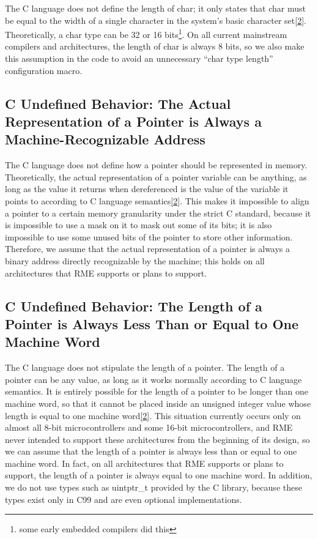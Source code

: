 The C language does not define the length of char; it only states that char must be equal to the width of a single character in the system's basic character set\hyperref[cite:9-2]{{[}2{]}}. Theoretically, a char type can be 32 or 16 bits\footnote{some early embedded compilers did this}. On all current mainstream compilers and architectures, the length of char is always 8 bits, so we also make this assumption in the code to avoid an unnecessary ``char type length'' configuration macro.

\subsection{C Undefined Behavior: The Actual Representation of a Pointer is Always a Machine-Recognizable Address}\label{subsec:9-pointer-representation}

The C language does not define how a pointer should be represented in memory. Theoretically, the actual representation of a pointer variable can be anything, as long as the value it returns when dereferenced is the value of the variable it points to according to C language semantics\hyperref[cite:9-2]{{[}2{]}}. This makes it impossible to align a pointer to a certain memory granularity under the strict C standard, because it is impossible to use a mask on it to mask out some of its bits; it is also impossible to use some unused bits of the pointer to store other information. Therefore, we assume that the actual representation of a pointer is always a binary address directly recognizable by the machine; this holds on all architectures that RME supports or plans to support.

\subsection{C Undefined Behavior: The Length of a Pointer is Always Less Than or Equal to One Machine Word}\label{subsec:9-pointer-size-bound}

The C language does not stipulate the length of a pointer. The length of a pointer can be any value, as long as it works normally according to C language semantics. It is entirely possible for the length of a pointer to be longer than one machine word, so that it cannot be placed inside an unsigned integer value whose length is equal to one machine word\hyperref[cite:9-2]{{[}2{]}}. This situation currently occurs only on almost all 8-bit microcontrollers and some 16-bit microcontrollers, and RME never intended to support these architectures from the beginning of its design, so we can assume that the length of a pointer is always less than or equal to one machine word. In fact, on all architectures that RME supports or plans to support, the length of a pointer is always equal to one machine word. In addition, we do not use types such as uintptr\_t provided by the C library, because these types exist only in C99 and are even optional implementations.

